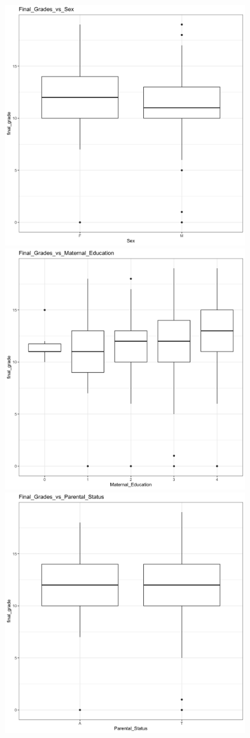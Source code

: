 \documentclass[]{article}
\begin{document}
\includegraphics[width=0.8\textwidth,height=\textheight]{images/Final_Grade_vs_Sex.png}
\includegraphics[width=0.8\textwidth,height=\textheight]{images/Final_Grade_vs_Maternal_Education.png}
\includegraphics[width=0.8\textwidth,height=\textheight]{images/Final_Grade_vs_Parental_status.png}
\end{document}
